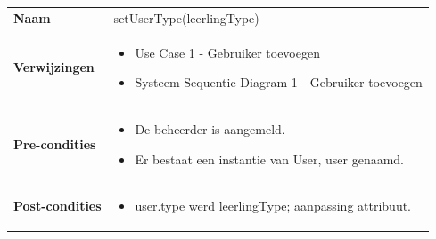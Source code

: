 \documentclass[a4paper]{article}
\begin{document}
\begin{tabularx}{\textwidth}{|l X|}
    \hline
    \textbf{Naam} & setUserType(leerlingType) \\
    \textbf{Verwijzingen} & \begin{itemize}[leftmargin=*]
        \item Use Case 1 - Gebruiker toevoegen
        \item Systeem Sequentie Diagram 1 - Gebruiker toevoegen
    \end{itemize}\\
    \textbf{Pre-condities} & \begin{itemize}[leftmargin=*]
        \item De beheerder is aangemeld.
        \item Er bestaat een instantie van User, user genaamd.
    \end{itemize}\\
    \textbf{Post-condities} & \begin{itemize}[leftmargin=*]
        \item user.type werd leerlingType; aanpassing attribuut.
    \end{itemize}\\
    \hline
\end{tabularx}\\
\end{document}
